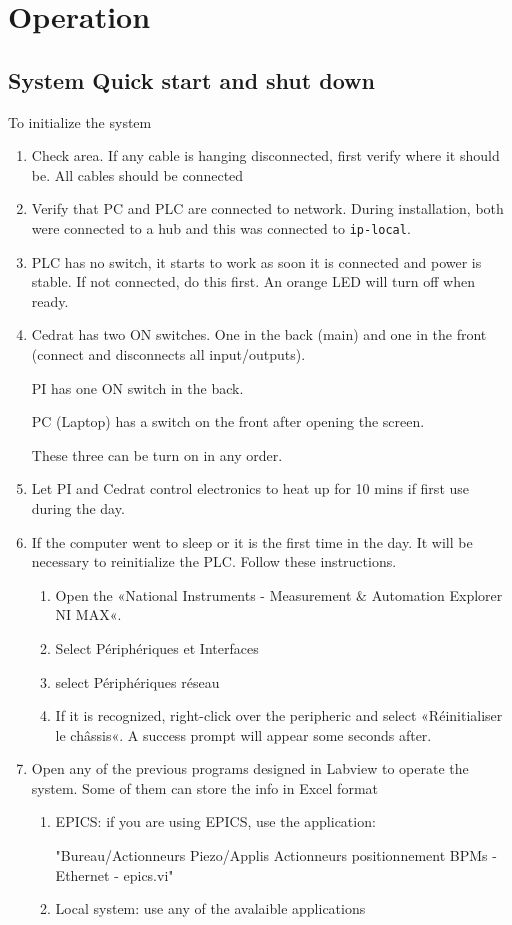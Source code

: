 \chapter{Operation}
\section{System Quick start and shut down}
To initialize the system\par
\begin{enumerate}
\item Check area. If any cable is hanging disconnected, first verify where it should be. All cables should be connected
\item Verify that PC and PLC are connected to network. During installation, both were connected to a hub and this was connected to \verb?ip-local?.
\item PLC has no switch, it starts to work as soon it is connected and power is stable. If not connected, do this first. An orange LED will turn off when ready.
\item Cedrat has two ON switches. One in the back (main) and one in the front (connect and disconnects all input/outputs).\par
PI has one ON switch in the back.\par
PC (Laptop) has a switch on the front after opening the screen.\par
These three can be turn on in any order.
\item Let PI and Cedrat control electronics to heat up for 10 mins if first use during the day.\par
\item If the computer went to sleep or it is the first time in the day. It will be necessary to reinitialize the PLC. Follow these instructions.
\begin{enumerate}
\item Open the «National Instruments - Measurement \& Automation Explorer NI MAX«.
\item Select Périphériques et Interfaces
\item select Périphériques réseau
\item If it is recognized, right-click over the peripheric and select «Réinitialiser le châssis«. A success prompt will appear some seconds after.
\end{enumerate}
\item Open any of the previous programs designed in Labview to operate the system. Some of them can store the info in Excel format
\begin{enumerate}
 \item  EPICS: if you are using EPICS, use the application:\par
"Bureau/Actionneurs Piezo/Applis Actionneurs positionnement BPMs - Ethernet - epics.vi"
\item Local system: use any of the avalaible applications\par
\end{enumerate}
\end{enumerate}
                                                          



